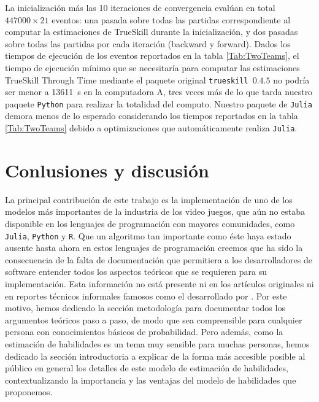 \documentclass[a4paper,11pt]{book}
\theoremstyle{definition}
\newif\ifen
\newcommand{\en}[1]{\ifen#1\fi}
\begin{document}
%
La inicializaci\'on m\'as las 10 iteraciones de convergencia eval\'uan en total $447000\times 21$ eventos: una pasada sobre todas las partidas correspondiente al computar la estimaciones de TrueSkill durante la inicializaci\'on, y dos pasadas sobre todas las partidas por cada iteraci\'on (backward y forward).
%
Dados los tiempos de ejecuci\'on de los eventos reportados en la tabla \ref{Tab:TwoTeams}, el tiempo de ejecuci\'on m\'inimo que se necesitar\'ia para computar las estimaciones TrueSkill Through Time mediante el paquete original \texttt{trueskill}~$0.4.5$ no podr\'ia ser menor a \SI{13611}{\s} en la computadora A, tres veces m\'as de lo que tarda nuestro paquete \texttt{Python} para realizar la totalidad del computo.
%
Nuestro paquete de \texttt{Julia} demora menos de lo esperado considerando los tiempos reportados en la tabla \ref{Tab:TwoTeams} debido a optimizaciones que autom\'aticamente realiza \texttt{Julia}.
%




\section{Conlusiones y discusi\'on} \label{sec:summary}


La principal contribuci\'on de este trabajo es la implementaci\'on de uno de los modelos m\'as importantes de la industria de los video juegos, que a\'un no estaba disponible en los lenguajes de programaci\'on con mayores comunidades, como \texttt{Julia}, \texttt{Python} y \texttt{R}.
%
Que un algoritmo tan importante como \'este haya estado ausente hasta ahora en estos lenguajes de programaci\'on creemos que ha sido la consecuencia de la falta de documentaci\'on que permitiera a los desarrolladores de software entender todos los aspectos te\'oricos que se requieren para su implementaci\'on.
%
Esta informaci\'on no est\'a presente ni en los art\'iculos originales \cite{Herbrich2007, Dangauthier2007} ni en reportes t\'ecnicos informales famosos como el desarrollado por \cite{Mosser2011}.
%
Por este motivo, hemos dedicado la secci\'on metodolog\'ia para documentar todos los argumentos te\'oricos paso a paso, de modo que sea comprensible para cualquier persona con conocimientos b\'asicos de probabilidad.
%
Pero adem\'as, como la estimaci\'on de habilidades es un tema muy sensible para muchas personas, hemos dedicado la secci\'on introductoria a explicar de la forma m\'as accesible posible al p\'ublico en general los detalles de este modelo de estimaci\'on de habilidades, contextualizando la importancia y las ventajas del modelo de habilidades que proponemos.
\end{document}
